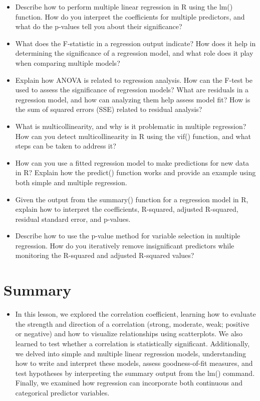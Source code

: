 \documentclass[
  letterpaper,
  DIV=11,
  numbers=noendperiod]{scrreprt}
\providecommand{\tightlist}{%
  \setlength{\itemsep}{0pt}\setlength{\parskip}{0pt}}\usepackage{longtable,booktabs,array}
\begin{document}
\begin{itemize}
  residual standard error (RSE) and adjusted R-squared help in
  interpreting a model?
\item
  Describe how to perform multiple linear regression in R using the lm()
  function. How do you interpret the coefficients for multiple
  predictors, and what do the p-values tell you about their
  significance?
\item
  What does the F-statistic in a regression output indicate? How does it
  help in determining the significance of a regression model, and what
  role does it play when comparing multiple models?
\item
  Explain how ANOVA is related to regression analysis. How can the
  F-test be used to assess the significance of regression models? What
  are residuals in a regression model, and how can analyzing them help
  assess model fit? How is the sum of squared errors (SSE) related to
  residual analysis?
\item
  What is multicollinearity, and why is it problematic in multiple
  regression? How can you detect multicollinearity in R using the vif()
  function, and what steps can be taken to address it?
\item
  How can you use a fitted regression model to make predictions for new
  data in R? Explain how the predict() function works and provide an
  example using both simple and multiple regression.
\item
  Given the output from the summary() function for a regression model in
  R, explain how to interpret the coefficients, R-squared, adjusted
  R-squared, residual standard error, and p-values.
\item
  Describe how to use the p-value method for variable selection in
  multiple regression. How do you iteratively remove insignificant
  predictors while monitoring the R-squared and adjusted R-squared
  values?
\end{itemize}


\chapter{Summary}\label{summary-7}

\begin{itemize}
\tightlist
\item
  In this lesson, we explored the correlation coefficient, learning how
  to evaluate the strength and direction of a correlation (strong,
  moderate, weak; positive or negative) and how to visualize
  relationships using scatterplots. We also learned to test whether a
  correlation is statistically significant. Additionally, we delved into
  simple and multiple linear regression models, understanding how to
  write and interpret these models, assess goodness-of-fit measures, and
  test hypotheses by interpreting the summary output from the lm()
  command. Finally, we examined how regression can incorporate both
  continuous and categorical predictor variables.
\end{itemize}
\end{document}

